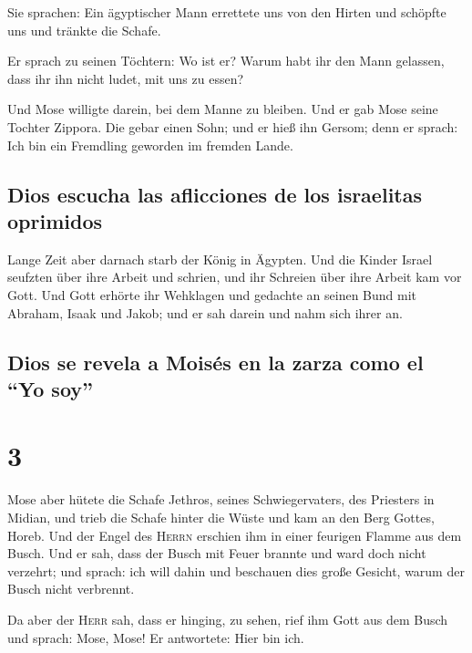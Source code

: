  Sie sprachen: Ein ägyptischer Mann errettete uns von den
Hirten und schöpfte uns und tränkte die Schafe.

 Er sprach zu seinen Töchtern: Wo ist er? Warum habt ihr
den Mann gelassen, dass ihr ihn nicht ludet, mit uns zu essen?

 Und Mose willigte darein, bei dem Manne zu bleiben. Und
er gab Mose seine Tochter Zippora.  Die gebar einen Sohn;
und er hieß ihn Gersom; denn er sprach: Ich bin ein Fremdling geworden
im fremden Lande.

\hypertarget{dios-escucha-las-aflicciones-de-los-israelitas-oprimidos}{%
\subsection{Dios escucha las aflicciones de los israelitas
oprimidos}\label{dios-escucha-las-aflicciones-de-los-israelitas-oprimidos}}

 Lange Zeit aber darnach starb der König in Ägypten. Und
die Kinder Israel seufzten über ihre Arbeit und schrien, und ihr
Schreien über ihre Arbeit kam vor Gott.  Und Gott erhörte
ihr Wehklagen und gedachte an seinen Bund mit Abraham, Isaak und Jakob;
 und er sah darein und nahm sich ihrer an.

\hypertarget{dios-se-revela-a-moisuxe9s-en-la-zarza-como-el-yo-soy}{%
\subsection{Dios se revela a Moisés en la zarza como el ``Yo
soy''}\label{dios-se-revela-a-moisuxe9s-en-la-zarza-como-el-yo-soy}}

\hypertarget{section-2}{%
\section{3}\label{section-2}}

 Mose aber hütete die Schafe Jethros, seines
Schwiegervaters, des Priesters in Midian, und trieb die Schafe hinter
die Wüste und kam an den Berg Gottes, Horeb.  Und der
Engel des \textsc{Herrn} erschien ihm in einer feurigen Flamme aus dem
Busch. Und er sah, dass der Busch mit Feuer brannte und ward doch nicht
verzehrt;  und sprach: ich will dahin und beschauen dies
große Gesicht, warum der Busch nicht verbrennt.

 Da aber der \textsc{Herr} sah, dass er hinging, zu sehen,
rief ihm Gott aus dem Busch und sprach: Mose, Mose! Er antwortete: Hier
bin ich.

